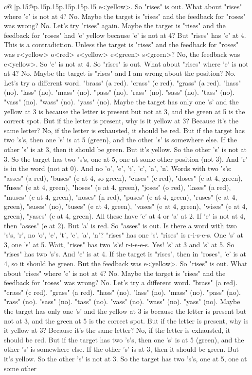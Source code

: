 \documentclass{article}
\begin{document}
{\begin{supertabular}{c@{$\;$}|p{.15\linewidth}@{}p{.15\linewidth}p{.15\linewidth}p{.15\linewidth}p{.15\linewidth}p{.15\linewidth}}
{{{e<yellow>. So "rises" is out. What about "rises" where 'e' is not at 4? No. Maybe the target is "rises" and the feedback for "roses" was wrong? No. Let's try "rises" again. Maybe the target is "rises" and the feedback for "roses" had 'e' yellow because 'e' is not at 4? But "rises" has 'e' at 4. This is a contradiction. Unless the target is "rises" and the feedback for "roses" was r<yellow> o<red> s<yellow> e<green> s<green>? No, the feedback was e<yellow>. So 'e' is not at 4. So "rises" is out. What about "rises" where 'e' is not at 4? No. Maybe the target is "rises" and I am wrong about the position? No. Let's try a different word. "brass" (a red). "crass" (c red). "grass" (a red). "hass" (no). "lass" (no). "mass" (no). "pass" (no). "rass" (no). "sass" (no). "tass" (no). "vass" (no). "wass" (no). "yass" (no). Maybe the target has only one 's' and the yellow at 3 is because the letter is present but not at 3, and the green at 5 is the correct spot. But if the letter is present, why is it yellow at 3? Because it's the same letter? No, if the letter is exhausted, it should be red. But if the target has two 's's, then one 's' is at 5 (green), and the other 's' is somewhere else. If the other 's' is at 3, then it should be green. But it's yellow. So the other 's' is not at 3. So the target has two 's's, one at 5, one at some other position (not 3). And 'r' is in the word (not at 0). And no 'o', 'e', 't', 'c', 'a', 'n'. Words with two 's's: "asses" (a red), "buses" (e at 4, so green), "cuses" (c red), "doses" (e at 4, green), "fuses" (e at 4, green), "hoses" (e at 4, green), "joses" (o red), "lases" (a red), "muses" (e at 4, green), "noses" (n red), "puses" (e at 4, green), "ruses" (e at 4, green), "suses" (no), "tuses" (e at 4, green), "vases" (e at 4, green), "wises" (e at 4, green), "yases" (e at 4, green). All these have 'e' at 4 or 'a' at 2. If 'e' is not at 4, then "asses" (e at 2). But 'a' is red. So "asses" is out. Is there a word with two 's's, 'r', no 'o', 'e', 't', 'c', 'a', 'n'? "rises" has one 's'. "rises" is r{-}i{-}s{-}e{-}s. One 's' at 3, one 's' at 5. Wait, "rises" has two 's's! r{-}i{-}s{-}e{-}s. Yes! 's' at 3 and 's' at 5. So "rises" has two 's's. And 'e' is at 4. If the target is "rises", then in "roses", 'e' is at 4, so it should be green. But the feedback was e<yellow>. So "rises" is out. What about "rises" where 'e' is not at 4? No. Maybe the target is "rises" and the feedback for "roses" was wrong? No. Let's try a different word. "brass" (a red). "crass" (c red). "grass" (a red). "hass" (no). "lass" (no). "mass" (no). "pass" (no). "rass" (no). "sass" (no). "tass" (no). "vass" (no). "wass" (no). "yass" (no). Maybe the target has only one 's' and the yellow at 3 is because the letter is present but not at 3, and the green at 5 is the correct spot. But if the letter is present, why is it yellow at 3? Because it's the same letter? No, if the letter is exhausted, it should be red. But if the target has two 's's, then one 's' is at 5 (green), and the other 's' is somewhere else. If the other 's' is at 3, then it should be green. But it's yellow. So the other 's' is not at 3. So the target has two 's's, one at 5, one at some other }}}
\end{supertabular}}
\end{document}
